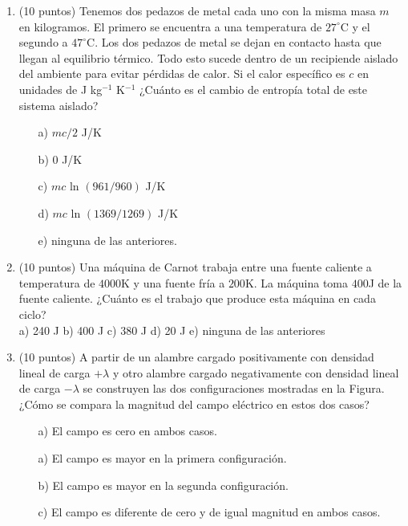 \documentclass{article}
\begin{document}
\newpage
\begin{enumerate}


\item (10 puntos) 
Tenemos dos pedazos de metal cada uno con la misma masa $m$ en kilogramos. El
primero se encuentra a una temperatura de $27^{\circ}$C y el segundo a
$47^{\circ}$C. Los dos pedazos de metal se dejan en contacto hasta que
llegan al equilibrio t\'ermico. Todo esto sucede dentro de un
recipiende aislado del ambiente para evitar p\'erdidas de calor. Si el
calor específico es $c$ en unidades de J kg$^{-1}$ K$^{-1}$ ¿Cuánto es el cambio de entropía total de este
sistema aislado?  

\begin{itemize}
\item[a)]  $mc/2$ J/K
\item[b)]  0 J/K
\item[c)]  $mc$ ln $(961/960)$ J/K
\item[d)]  $mc$ ln $(1369/1269)$ J/K
\item[e)]  ninguna de las anteriores.
\end{itemize}


\item (10 puntos) Una m\'aquina de Carnot trabaja entre una fuente
  caliente a temperatura de $4000$K y una fuente fr\'ia a $200$K. La
  máquina toma $400$J de la fuente caliente. ¿Cuánto es
  el trabajo que produce esta máquina en cada ciclo? \\


a) 240 J b) 400 J  c) 380 J d) 20 J e) ninguna de las anteriores\\


\item (10 puntos) A partir de un alambre cargado positivamente con
  densidad lineal de carga $+\lambda$ y otro alambre cargado
  negativamente con densidad lineal de carga $-\lambda$ se construyen
  las dos configuraciones mostradas en la Figura. ¿Cómo se compara la
  magnitud del campo eléctrico en estos dos casos?

\begin{itemize}
\item[a)] El campo es cero en ambos casos.
\item[a)] El campo es mayor en la primera configuraci\'on.
\item[b)] El campo es mayor en la segunda configuraci\'on.
\item[c)] El campo es diferente de cero y de igual magnitud en ambos casos.
\end{itemize}


\end{enumerate}
\end{document}
